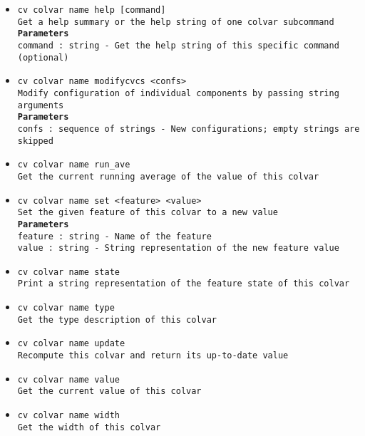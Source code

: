 \begin{itemize}
\item \texttt{cv colvar name help [command]}
\\
\texttt{Get a help summary or the help string of one colvar subcommand}
\\
\texttt{\textbf{Parameters}}
\\
\texttt{command : string - Get the help string of this specific command (optional)}
\item \texttt{cv colvar name modifycvcs <confs>}
\\
\texttt{Modify configuration of individual components by passing string arguments}
\\
\texttt{\textbf{Parameters}}
\\
\texttt{confs : sequence of strings - New configurations; empty strings are skipped}
\item \texttt{cv colvar name run\_ave}
\\
\texttt{Get the current running average of the value of this colvar}
\item \texttt{cv colvar name set <feature> <value>}
\\
\texttt{Set the given feature of this colvar to a new value}
\\
\texttt{\textbf{Parameters}}
\\
\texttt{feature : string - Name of the feature}
\\
\texttt{value : string - String representation of the new feature value}
\item \texttt{cv colvar name state}
\\
\texttt{Print a string representation of the feature state of this colvar}
\item \texttt{cv colvar name type}
\\
\texttt{Get the type description of this colvar}
\item \texttt{cv colvar name update}
\\
\texttt{Recompute this colvar and return its up-to-date value}
\item \texttt{cv colvar name value}
\\
\texttt{Get the current value of this colvar}
\item \texttt{cv colvar name width}
\\
\texttt{Get the width of this colvar}
\end{itemize}

